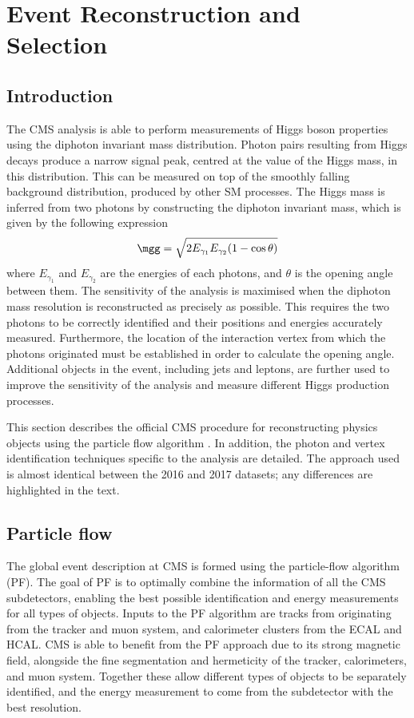 \chapter{Event Reconstruction and Selection}
\label{chap:objects}

\section{Introduction}

The CMS \Hgg analysis is able to perform measurements of Higgs boson properties using the diphoton invariant mass distribution.
Photon pairs resulting from Higgs decays produce a narrow signal peak, centred at the value of the Higgs mass, in this distribution.
This can be measured on top of the smoothly falling background distribution, produced by other SM processes.
The Higgs mass is inferred from two photons by constructing the diphoton invariant mass, which is given by the following expression
\begin{equation}
\label{eq:obj_mgg}
\mgg = \sqrt{ 2 E_{\gamma_1} E_{\gamma_2} (1 - \cos{\theta}) }
\end{equation}
where $E_{\gamma_1}$ and $E_{\gamma_2}$ are the energies of each photons, and $\theta$ is the opening angle between them.
The sensitivity of the analysis is maximised when the diphoton mass resolution is reconstructed as precisely as possible.
This requires the two photons to be correctly identified and their positions and energies accurately measured.
Furthermore, the location of the interaction vertex from which the photons originated must be established in order to calculate the opening angle.
Additional objects in the event, including jets and leptons, are further used to improve the sensitivity of the analysis and measure different Higgs production processes.

This section describes the official CMS procedure for reconstructing physics objects using the particle flow algorithm \cite{ParticleFlow}.
In addition, the photon and vertex identification techniques specific to the \Hgg analysis are detailed.
The approach used is almost identical between the 2016 and 2017 datasets; 
any differences are highlighted in the text.

\section{Particle flow}
The global event description at CMS is formed using the particle-flow algorithm (PF).
The goal of PF is to optimally combine the information of all the CMS subdetectors, 
enabling the best possible identification and energy measurements for all types of objects.
Inputs to the PF algorithm are tracks from originating from the tracker and muon system, 
and calorimeter clusters from the ECAL and HCAL.
CMS is able to benefit from the PF approach due to its strong magnetic field, 
alongside the fine segmentation and hermeticity of the tracker, calorimeters, and muon system.
Together these allow different types of objects to be separately identified, 
and the energy measurement to come from the subdetector with the best resolution.

